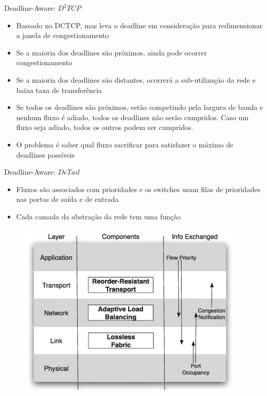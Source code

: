 \documentclass[aspectratio=169]{beamer}
\begin{document}
	\begin{frame} {Deadline-Aware: $D^2TCP$}
		\begin{itemize}
		 	\item
		 		Baseado no DCTCP, mas leva o deadline em consideração para redimensionar a janela de congestionamento
		 	\item
				Se a maioria dos deadlines são próximos, ainda pode ocorrer congestionamento
		 	\item
				Se a maioria dos deadlines são distantes, ocorrerá a sub-utilização da rede e baixa taxa de transferência
		 	\item
				Se todos os deadlines são próximos, estão competindo pela largura de banda e nenhum fluxo é adiado, todos os deadlines não serão cumpridos. Caso um fluxo seja adiado, todos os outros podem ser cumpridos.
		 	\item
				O problema é saber qual fluxo sacrificar para satisfazer o máximo de deadlines possíveis
		 \end{itemize}
	\end{frame}

	\begin{frame} {Deadline-Aware: $DeTail$}
		\begin{itemize}
		 	\item
		 		Fluxos são associados com prioridades e os switches usam filas de prioridades nas portas de saída e de entrada
		 	\item
				Cada camada da abstração da rede tem uma função
		 \end{itemize}

		\begin{figure}[ht]   
			\includegraphics[scale=0.5]{imagens/detail.png}
			\label{fig:sample_figure}
		\end{figure}
	\end{frame}
\end{document}
